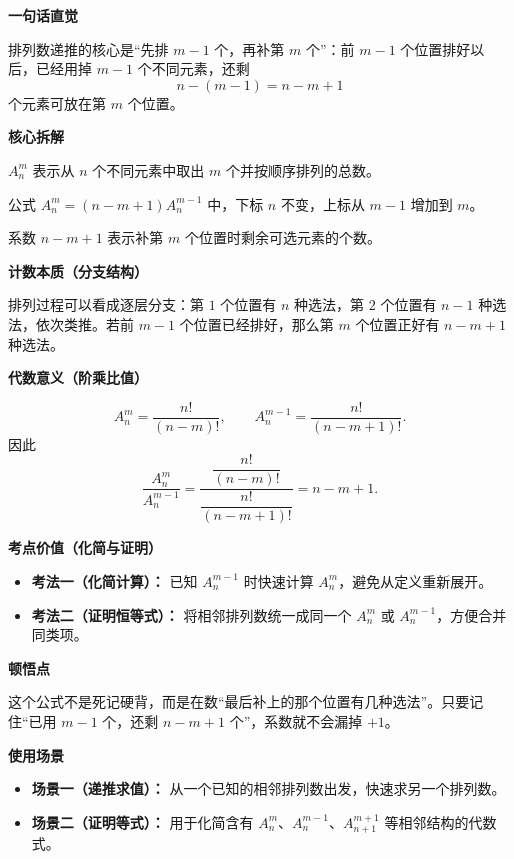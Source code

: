 \begin{explanationbox}
\textbf{\textcolor{CExplanation}{一句话直觉}}

排列数递推的核心是“先排 $m-1$ 个，再补第 $m$ 个”：前 $m-1$ 个位置排好以后，已经用掉 $m-1$ 个不同元素，还剩
\[
    n-(m-1)=n-m+1
\]
个元素可放在第 $m$ 个位置。

\medskip
\textbf{\textcolor{CExplanation}{核心拆解}}
\begin{description}[style=nextline, leftmargin=2.8em, labelsep=0.5em, itemsep=0.45em]
    \item[\textbf{要点一（符号含义）：}] $A_n^m$ 表示从 $n$ 个不同元素中取出 $m$ 个并按顺序排列的总数。
    \item[\textbf{要点二（递推方向）：}] 公式 $A_n^m=(n-m+1)A_n^{m-1}$ 中，下标 $n$ 不变，上标从 $m-1$ 增加到 $m$。
    \item[\textbf{要点三（因子含义）：}] 系数 $n-m+1$ 表示补第 $m$ 个位置时剩余可选元素的个数。
\end{description}

\medskip
\textbf{\textcolor{CExplanation}{计数本质（分支结构）}}

排列过程可以看成逐层分支：第 $1$ 个位置有 $n$ 种选法，第 $2$ 个位置有 $n-1$ 种选法，依次类推。若前 $m-1$ 个位置已经排好，那么第 $m$ 个位置正好有 $n-m+1$ 种选法。

\medskip
\textbf{\textcolor{CExplanation}{代数意义（阶乘比值）}}

\[
A_n^m=\frac{n!}{(n-m)!},\qquad
A_n^{m-1}=\frac{n!}{(n-m+1)!}.
\]
因此
\[
\frac{A_n^m}{A_n^{m-1}}
=\frac{\dfrac{n!}{(n-m)!}}{\dfrac{n!}{(n-m+1)!}}
=n-m+1.
\]

\medskip
\textbf{\textcolor{CExplanation}{考点价值（化简与证明）}}
\begin{itemize}[leftmargin=*, itemsep=0.5em, topsep=0.4em]
    \item \textbf{考法一（化简计算）：} 已知 $A_n^{m-1}$ 时快速计算 $A_n^m$，避免从定义重新展开。
    \item \textbf{考法二（证明恒等式）：} 将相邻排列数统一成同一个 $A_n^m$ 或 $A_n^{m-1}$，方便合并同类项。
\end{itemize}

\medskip
\textbf{\textcolor{CExplanation}{顿悟点}}

这个公式不是死记硬背，而是在数“最后补上的那个位置有几种选法”。只要记住“已用 $m-1$ 个，还剩 $n-m+1$ 个”，系数就不会漏掉 $+1$。

\medskip
\textbf{\textcolor{CExplanation}{使用场景}}
\begin{itemize}[leftmargin=*, itemsep=0.5em, topsep=0.4em]
    \item \textbf{场景一（递推求值）：} 从一个已知的相邻排列数出发，快速求另一个排列数。
    \item \textbf{场景二（证明等式）：} 用于化简含有 $A_n^m$、$A_n^{m-1}$、$A_{n+1}^{m+1}$ 等相邻结构的代数式。
\end{itemize}
\end{explanationbox}
